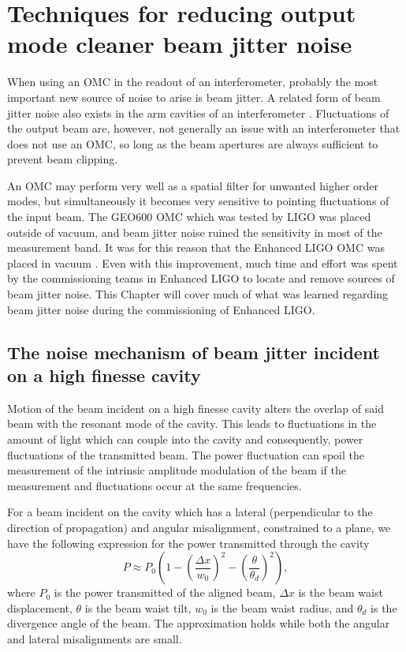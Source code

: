 \chapter{Techniques for reducing output mode cleaner beam jitter noise}
\label{ch:jitter}
When using an OMC in the readout of an interferometer, probably the most important new source of noise to arise is beam jitter. %
A related form of beam jitter noise also exists in the arm cavities of an interferometer \cite{Kawamura:94}. %
Fluctuations of the output beam are, however, not generally an issue with an interferometer that does not use an OMC, so long as the beam apertures are always sufficient to prevent beam clipping. %


An OMC may perform very well as a spatial filter for unwanted higher order modes, but simultaneously it becomes very sensitive to pointing fluctuations of the input beam. %
The GEO600 OMC which was tested by LIGO was placed outside of vacuum, and beam jitter noise ruined the sensitivity in most of the measurement band. %
It was for this reason that the Enhanced LIGO OMC was placed in vacuum \cite{G040326}. %
Even with this improvement, much time and effort was spent by the commissioning teams in Enhanced LIGO to locate and remove sources of beam jitter noise. %
This Chapter will cover much of what was learned regarding beam jitter noise during the commissioning of Enhanced LIGO.

\section{The noise mechanism of beam jitter incident on a high finesse cavity}

Motion of the beam incident on a high finesse cavity alters the overlap of said beam with the resonant mode of the cavity. %
This leads to fluctuations in the amount of light which can couple into the cavity and consequently, power fluctuations of the transmitted beam. %
The power fluctuation can spoil the measurement of the intrinsic amplitude modulation of the beam if the measurement and fluctuations occur at the same frequencies.

For a beam incident on the cavity which has a lateral (perpendicular to the direction of propagation) and angular misalignment, constrained to a plane, we have the following expression for the power transmitted through the cavity
\begin{equation}
\label{eqn:simplejitter}
P\approx P_0\left(1-\left(\frac{\Delta x}{w_0}\right)^2-\left(\frac{\theta}{\theta_d}\right)^2\right),
\end{equation}
where $P_0$ is the power transmitted of the aligned beam, $\Delta x$ is the beam waist displacement, $\theta$ is the beam waist tilt, $w_0$ is the beam waist radius, and $\theta_d$ is the divergence angle of the beam. %
The approximation holds while both the angular and lateral misalignments are small.

